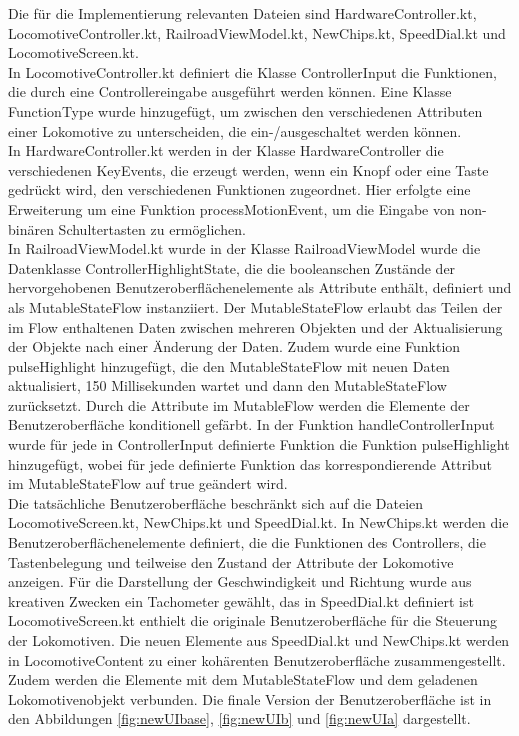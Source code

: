 \documentclass[first=Christoph,last=Hoentzsch,company=Softwareprojekt,location=Dresden,simple, noheader]{baarticle}
\begin{document}
\begin{basimple}
        Die für die Implementierung relevanten Dateien sind HardwareController.kt, LocomotiveController.kt, RailroadViewModel.kt, NewChips.kt, SpeedDial.kt und LocomotiveScreen.kt. \\
        In LocomotiveController.kt definiert die Klasse ControllerInput die Funktionen, die durch eine Controllereingabe ausgeführt werden können. 
        Eine Klasse FunctionType wurde hinzugefügt, um zwischen den verschiedenen Attributen einer Lokomotive zu unterscheiden, die ein-/ausgeschaltet werden können. \\
        In HardwareController.kt werden in der Klasse HardwareController die verschiedenen KeyEvents, die erzeugt werden, wenn ein Knopf oder eine Taste gedrückt wird, den verschiedenen Funktionen zugeordnet.
        Hier erfolgte eine Erweiterung um eine Funktion processMotionEvent, um die Eingabe von non-binären Schultertasten zu ermöglichen. \\
        In RailroadViewModel.kt wurde in der Klasse RailroadViewModel wurde die Datenklasse ControllerHighlightState, die die booleanschen Zustände der hervorgehobenen Benutzeroberflächenelemente als Attribute enthält, definiert und als MutableStateFlow instanziiert.
        Der MutableStateFlow erlaubt das Teilen der im Flow enthaltenen Daten zwischen mehreren Objekten und der Aktualisierung der Objekte nach einer Änderung der Daten.
        Zudem wurde eine Funktion pulseHighlight hinzugefügt, die den MutableStateFlow mit neuen Daten aktualisiert, 150 Millisekunden wartet und dann den MutableStateFlow zurücksetzt.
        Durch die Attribute im MutableFlow werden die Elemente der Benutzeroberfläche konditionell gefärbt.
        In der Funktion handleControllerInput wurde für jede in ControllerInput definierte Funktion die Funktion pulseHighlight hinzugefügt, wobei für jede definierte Funktion das korrespondierende Attribut im MutableStateFlow auf true geändert wird. \\
        Die tatsächliche Benutzeroberfläche beschränkt sich auf die Dateien LocomotiveScreen.kt, NewChips.kt und SpeedDial.kt.
        In NewChips.kt werden die Benutzeroberflächenelemente definiert, die die Funktionen des Controllers, die Tastenbelegung und teilweise den Zustand der Attribute der Lokomotive anzeigen.
        Für die Darstellung der Geschwindigkeit und Richtung wurde aus kreativen Zwecken ein Tachometer gewählt, das in SpeedDial.kt definiert ist
        LocomotiveScreen.kt enthielt die originale Benutzeroberfläche für die Steuerung der Lokomotiven.
        Die neuen Elemente aus SpeedDial.kt und NewChips.kt werden in LocomotiveContent zu einer kohärenten Benutzeroberfläche zusammengestellt. 
        Zudem werden die Elemente mit dem MutableStateFlow und dem geladenen Lokomotivenobjekt verbunden.
        Die finale Version der Benutzeroberfläche ist in den Abbildungen \ref{fig:newUIbase}, \ref{fig:newUIb} und \ref{fig:newUIa} dargestellt. 
        

\end{basimple}
\end{document}
